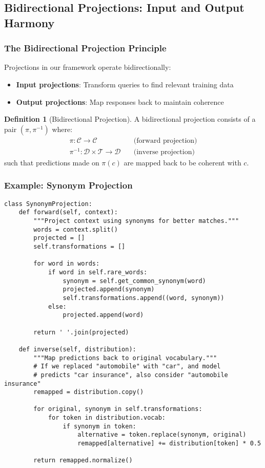 \documentclass{article}
\theoremstyle{definition}
\newtheorem{definition}{Definition}
\begin{document}
\subsection{Bidirectional Projections: Input and Output Harmony}

\subsubsection{The Bidirectional Projection Principle}

Projections in our framework operate bidirectionally:
\begin{itemize}
    \item \textbf{Input projections}: Transform queries to find relevant training data
    \item \textbf{Output projections}: Map responses back to maintain coherence
\end{itemize}

\begin{definition}[Bidirectional Projection]
A bidirectional projection consists of a pair $(\pi, \pi^{-1})$ where:
\begin{align}
\pi: \mathcal{C} \rightarrow \mathcal{C} \quad &\text{(forward projection)} \\
\pi^{-1}: \mathcal{D} \times \mathcal{T} \rightarrow \mathcal{D} \quad &\text{(inverse projection)}
\end{align}
such that predictions made on $\pi(c)$ are mapped back to be coherent with $c$.
\end{definition}

\subsubsection{Example: Synonym Projection}

\begin{lstlisting}
class SynonymProjection:
    def forward(self, context):
        """Project context using synonyms for better matches."""
        words = context.split()
        projected = []
        self.transformations = []

        for word in words:
            if word in self.rare_words:
                synonym = self.get_common_synonym(word)
                projected.append(synonym)
                self.transformations.append((word, synonym))
            else:
                projected.append(word)

        return ' '.join(projected)

    def inverse(self, distribution):
        """Map predictions back to original vocabulary."""
        # If we replaced "automobile" with "car", and model
        # predicts "car insurance", also consider "automobile insurance"
        remapped = distribution.copy()

        for original, synonym in self.transformations:
            for token in distribution.vocab:
                if synonym in token:
                    alternative = token.replace(synonym, original)
                    remapped[alternative] += distribution[token] * 0.5

        return remapped.normalize()
\end{lstlisting}
\end{document}
